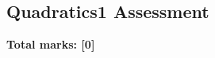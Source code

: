 \documentclass[../c1]{subfiles}
\begin{document}
\subsection*{Quadratics1 Assessment}
\thispagestyle{fancy}



\begin{flushright}
\textbf{Total marks: [0]}
\end{flushright}
\end{document}
